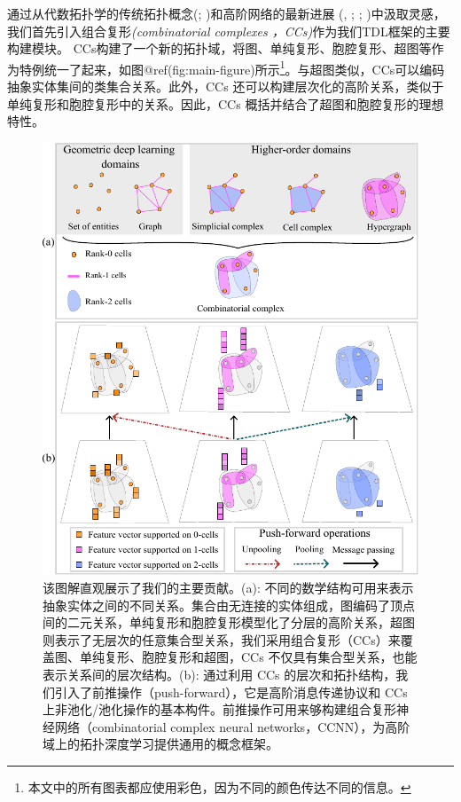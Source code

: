 \documentclass[
  12pt,
]{krantz}
\begin{document}
通过从代数拓扑学的传统拓扑概念(; )和高阶网络的最新进展
(,
;
;
)中汲取灵感，我们首先引入组合复形\emph{(combinatorial complexes
，CCs)}作为我们TDL框架的主要构建模块。
CCs构建了一个新的拓扑域，将图、单纯复形、胞腔复形、超图等作为特例统一了起来，如图@ref(fig:main-figure)所示\footnote{本文中的所有图表都应使用彩色，因为不同的颜色传达不同的信息。}。与超图类似，CCs可以编码抽象实体集间的类集合关系。此外，CCs
还可以构建层次化的高阶关系，类似于单纯复形和胞腔复形中的关系。因此，CCs
概括并结合了超图和胞腔复形的理想特性。

\begin{figure}

{\centering \includegraphics{figures/main_figure} 

}

\caption{该图解直观展示了我们的主要贡献。(a): 不同的数学结构可用来表示抽象实体之间的不同关系。集合由无连接的实体组成，图编码了顶点间的二元关系，单纯复形和胞腔复形模型化了分层的高阶关系，超图则表示了无层次的任意集合型关系，我们采用组合复形（CCs）来覆盖图、单纯复形、胞腔复形和超图，CCs 不仅具有集合型关系，也能表示关系间的层次结构。(b): 通过利用 CCs 的层次和拓扑结构，我们引入了前推操作（push-forward），它是高阶消息传递协议和 CCs上非池化/池化操作的基本构件。前推操作可用来够构建组合复形神经网络（combinatorial complex neural networks，CCNN），为高阶域上的拓扑深度学习提供通用的概念框架。}\label{fig:main-figure}
\end{figure}
\end{document}
